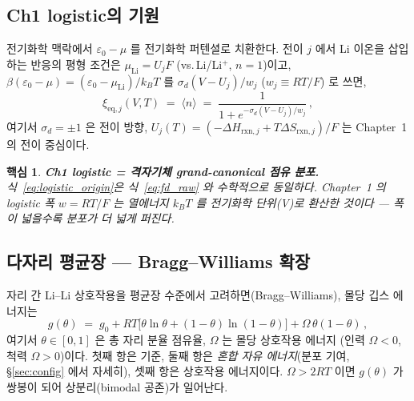 \documentclass[11pt,a4paper]{article}
\newtheorem*{keybox}{핵심}
\newcommand{\rxn}{\mathrm{rxn}}
\newcommand{\eq}{\mathrm{eq}}
\begin{document}
\subsection{Ch1 logistic의 기원}

전기화학 맥락에서 $\varepsilon_0-\mu$ 를 전기화학 퍼텐셜로 치환한다. 전이 $j$ 에서
Li 이온을 삽입하는 반응의 평형 조건은
$\mu_{\mathrm{Li}}=U_j F$ (vs.\,Li/Li$^+$, $n=1$)이고,
$\beta(\varepsilon_0-\mu)=(\varepsilon_0-\mu_{\mathrm{Li}})/k_BT$
를 $\sigma_d(V-U_j)/w_j$ ($w_j\equiv RT/F$) 로 쓰면,
\begin{equation}
  \xi_{\eq,j}(V,T) \;=\; \langle n\rangle \;=\;
  \frac{1}{1+e^{-\sigma_d(V-U_j)/w_j}}\,,
  \label{eq:logistic_origin}
\end{equation}
여기서 $\sigma_d=\pm1$ 은 전이 방향, $U_j(T)=(-\Delta H_{\rxn,j}+T\Delta S_{\rxn,j})/F$
는 Chapter~1 의 전이 중심이다.

\begin{keybox}
\textbf{Ch1 logistic = 격자기체 grand-canonical 점유 분포.}
식~\eqref{eq:logistic_origin}은 식~\eqref{eq:fd_raw} 와 수학적으로 동일하다.
Chapter~1 의 logistic 폭 $w=RT/F$ 는 열에너지 $k_BT$ 를 전기화학 단위(V)로
환산한 것이다 --- 폭이 넓을수록 분포가 더 넓게 퍼진다.
\end{keybox}

\subsection{다자리 평균장 — Bragg--Williams 확장}

자리 간 Li--Li 상호작용을 평균장 수준에서 고려하면(Bragg--Williams),
몰당 깁스 에너지는
\begin{equation}
  g(\theta) \;=\; g_0 + RT\bigl[\theta\ln\theta+(1-\theta)\ln(1-\theta)\bigr]
  + \Omega\,\theta(1-\theta)\,,
  \label{eq:BW}
\end{equation}
여기서 $\theta\in[0,1]$ 은 총 자리 분율 점유율, $\Omega$ 는 몰당 상호작용 에너지
(인력 $\Omega<0$, 척력 $\Omega>0$)이다. 첫째 항은 기준, 둘째 항은 \emph{혼합 자유
에너지}(분포 기여, \S\ref{sec:config} 에서 자세히), 셋째 항은 상호작용 에너지이다.
$\Omega>2RT$ 이면 $g(\theta)$ 가 쌍봉이 되어 상분리(bimodal 공존)가 일어난다.
\end{document}
